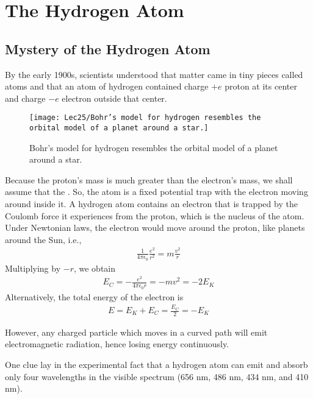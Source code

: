 \newpage
\section{The Hydrogen Atom}

\subsection{Mystery of the Hydrogen Atom}

By the early 1900s, scientists understood that matter came in tiny pieces called atoms and that an atom of hydrogen contained charge $+e$ proton at its center and charge $-e$ electron outside that center. 

\begin{figure}[H]
    \centering
    \texttt{[image: Lec25/Bohr’s model for hydrogen resembles the orbital model of a planet around a star.]}
    \caption{Bohr’s model for hydrogen resembles the orbital model of a planet around a star.}
\end{figure}

Because the proton's mass is much greater than the electron's mass, we shall assume that the . So, the atom is a fixed potential trap with the electron moving around inside it. A hydrogen atom contains an electron that is trapped by the Coulomb force it experiences from the proton, which is the nucleus of the atom. Under Newtonian laws, the electron would move around the proton, like planets around the Sun, i.e.,
\begin{align*}
    \frac{1}{4\pi \epsilon_0}\frac{e^2}{r^2}=m\frac{v^2}{r}
\end{align*}
Multiplying by $-r$, we obtain
\begin{align*}
    E_C=-\frac{e^2}{4\pi \epsilon_0 r}=-mv^2=-2E_K
\end{align*}
Alternatively, the total energy of the electron is 
\begin{align*}
    E=E_K+E_C=\frac{E_C}{2}=-E_K
\end{align*}

However, any charged particle which moves in a curved path will emit electromagnetic radiation, hence losing energy continuously. 

One clue lay in the experimental fact that a hydrogen atom can emit and absorb only four wavelengths in the visible spectrum (656 nm, 486 nm, 434 nm, and 410 nm).

